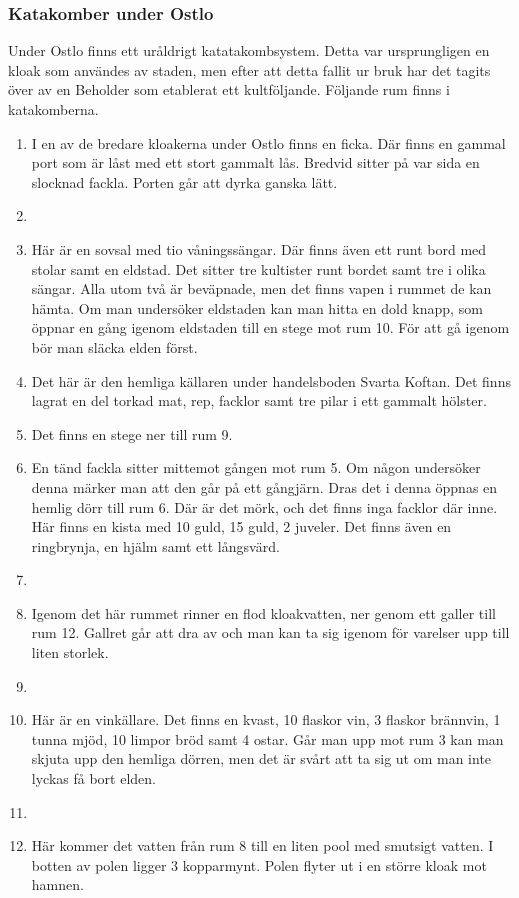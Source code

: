 \subsubsection{Katakomber under Ostlo}
Under Ostlo finns ett uråldrigt katatakombsystem. Detta var ursprungligen en kloak som användes av staden, men efter att detta fallit ur bruk har det tagits över av en Beholder som etablerat ett kultföljande. Följande rum finns i katakomberna.
%
\begin{enumerate}
	\item I en av de bredare kloakerna under Ostlo finns en ficka. Där finns en gammal port som är låst med ett stort gammalt lås. Bredvid sitter på var sida en slocknad fackla. Porten går att dyrka ganska lätt.
	\item 
	\item Här är en sovsal med tio våningssängar. Där finns även ett runt bord med stolar samt en eldstad. Det sitter tre kultister runt bordet samt tre i olika sängar. Alla utom två är beväpnade, men det finns vapen i rummet de kan hämta. Om man undersöker eldstaden kan man hitta en dold knapp, som öppnar en gång igenom eldstaden till en stege mot rum 10. För att gå igenom bör man släcka elden först. 
	\item Det här är den hemliga källaren under handelsboden Svarta Koftan. Det finns lagrat en del torkad mat, rep, facklor samt tre pilar i ett gammalt hölster.
	\item Det finns en stege ner till rum 9.
	\item En tänd fackla sitter mittemot gången mot rum 5. Om någon undersöker denna märker man att den går på ett gångjärn. Dras det i denna öppnas en hemlig dörr till rum 6. Där är det mörk, och det finns inga facklor där inne. Här finns en kista med 10 guld, 15 guld, 2 juveler. Det finns även en ringbrynja, en hjälm samt ett långsvärd.
	\item
	\item Igenom det här rummet rinner en flod kloakvatten, ner genom ett galler till rum 12. Gallret går att dra av och man kan ta sig igenom för varelser upp till liten storlek.
	\item 
	\item Här är en vinkällare. Det finns en kvast, 10 flaskor vin, 3 flaskor brännvin, 1 tunna mjöd, 10 limpor bröd samt 4 ostar. Går man upp mot rum 3 kan man skjuta upp den hemliga dörren, men det är svårt att ta sig ut om man inte lyckas få bort elden.
	\item 
	\item Här kommer det vatten från rum 8 till en liten pool med smutsigt vatten. I botten av polen ligger 3 kopparmynt. Polen flyter ut i en större kloak mot hamnen.

\end{enumerate}
